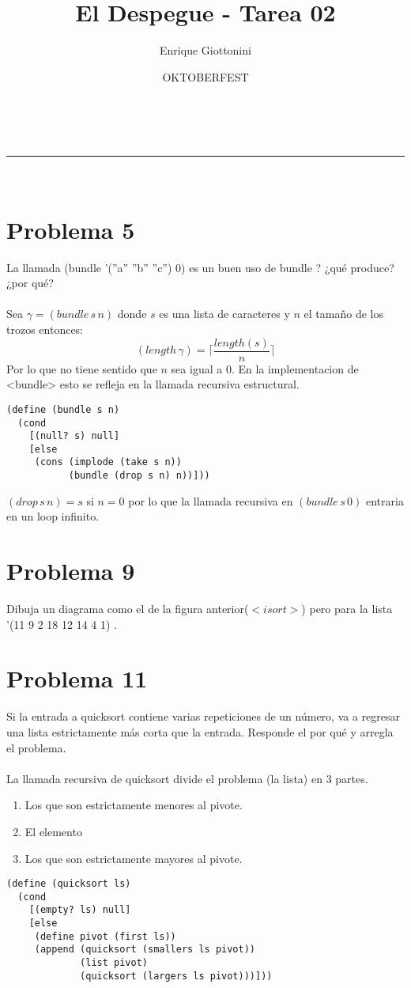 \documentclass[a4paper,11pt]{article}
\makeatletter
\newcommand{\linia}{\rule{\linewidth}{0.5pt}}
\theoremstyle{mytheor}
\renewcommand{\maketitle}{
\begin{center}
\vspace{2ex}
{\huge \textsc{\@title}}
\vspace{1ex}
\\
\linia\\
\@author \hfill \@date
\vspace{4ex}
\end{center}
}
\makeatother
\begin{document}
\title{El Despegue - Tarea \textnumero{} 02}

\author{Enrique Giottonini}

\date{OKTOBERFEST}

\maketitle

\section*{Problema 5}
La llamada (bundle ’(”a” ”b” ”c”) 0) es un buen uso de bundle ? ¿qué produce?
¿por qué? \\ \\
Sea $\gamma = (bundle\, s\, n)$ donde $s$ es una lista de caracteres y $n$ el tamaño de los trozos entonces:
\[ (length\,\gamma) = \Big \lceil \dfrac{length(s)}{n}\Big \rceil\]
Por lo que no tiene sentido que $n$ sea igual a 0. En la implementacion de <bundle> esto se refleja en la llamada recursiva estructural.

\begin{lstlisting}[title=bundle]
(define (bundle s n)
  (cond
    [(null? s) null]
    [else
     (cons (implode (take s n))
           (bundle (drop s n) n))]))
\end{lstlisting}

$(drop \,s \,n) = s$ si $n=0$ por lo que la llamada recursiva  en $(bundle\, s\, 0)$ entraria en un loop infinito.
\\
 

\section*{Problema 9}
Dibuja un diagrama como el de la figura anterior($<isort>$) pero para la lista ’(11 9 2 18 12
14 4 1) .

\newpage
\section*{Problema 11}
Si la entrada a quicksort contiene varias repeticiones de un número, va a regresar
una lista estrictamente más corta que la entrada. Responde el por qué y arregla el problema. \\ \\

La llamada recursiva de quicksort divide el problema (la lista) en 3 partes.
\begin{enumerate}
\item Los que son estrictamente menores al pivote.
\item El elemento
\item Los que son estrictamente mayores al pivote.
\end{enumerate}
\begin{lstlisting}[title=quicksort]
(define (quicksort ls)
  (cond
    [(empty? ls) null]
    [else
     (define pivot (first ls))
     (append (quicksort (smallers ls pivot))
             (list pivot)
             (quicksort (largers ls pivot)))]))
\end{lstlisting}
\end{document}
